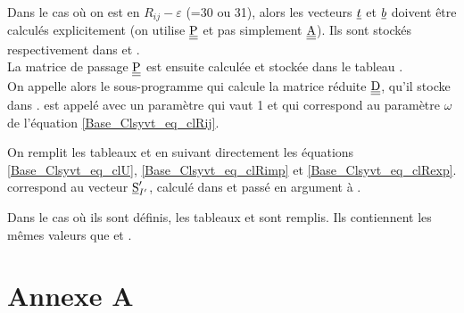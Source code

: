 Dans le cas o\`u on est en $R_{ij}-\varepsilon$ (=30 ou 31),
alors les
vecteurs $\underline{t}$ et $\underline{b}$ doivent \^etre calcul\'es explicitement
(on utilise $\underline{\underline{\textrm{P}}}$ et pas simplement $\underline{\underline{\textrm{A}}}$).
Ils sont stock\'es respectivement dans  et
.\\ 
La matrice de passage $\underline{\underline{\textrm{P}}}$ est ensuite calcul\'ee et stock\'ee dans le
tableau .\\
On appelle alors le sous-programme  qui calcule la matrice
r\'eduite $\underline{\underline{\textrm{D}}}$, qu'il stocke dans .  est appel\'e
avec un param\`etre  qui vaut 1 et qui correspond au param\`etre
$\omega$ de l'\'equation \ref{Base_Clsyvt_eq_clRij}.


On remplit les tableaux  et  en suivant directement les
\'equations \ref{Base_Clsyvt_eq_clU}, \ref{Base_Clsyvt_eq_clRimp} et \ref{Base_Clsyvt_eq_clRexp}.\\
 correspond au vecteur $\underline{\textrm{S}}_{I'}^\prime$, calcul\'e dans 
 et pass\'e en argument \`a .

Dans le cas o\`u ils sont d\'efinis, les tableaux  et 
sont remplis. Ils contiennent les m\^emes valeurs que  et
.


\section{Annexe A}

